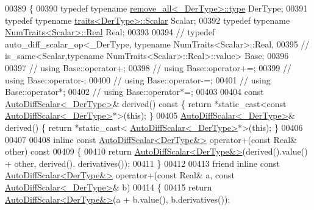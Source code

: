 \begin{DoxyCode}
00389 \{
00390   \textcolor{keyword}{typedef} \textcolor{keyword}{typename} \hyperlink{struct_eigen_1_1internal_1_1remove__all}{remove\_all<\_DerType>::type} DerType;
00391   \textcolor{keyword}{typedef} \textcolor{keyword}{typename} \hyperlink{struct_eigen_1_1internal_1_1traits}{traits<DerType>::Scalar} Scalar;
00392   \textcolor{keyword}{typedef} \textcolor{keyword}{typename} \hyperlink{group___core___module_struct_eigen_1_1_num_traits}{NumTraits<Scalar>::Real} Real;
00393 
00394 \textcolor{comment}{//   typedef auto\_diff\_scalar\_op<\_DerType, typename NumTraits<Scalar>::Real,}
00395 \textcolor{comment}{//                            is\_same<Scalar,typename NumTraits<Scalar>::Real>::value> Base;}
00396 
00397 \textcolor{comment}{//   using Base::operator+;}
00398 \textcolor{comment}{//   using Base::operator+=;}
00399 \textcolor{comment}{//   using Base::operator-;}
00400 \textcolor{comment}{//   using Base::operator-=;}
00401 \textcolor{comment}{//   using Base::operator*;}
00402 \textcolor{comment}{//   using Base::operator*=;}
00403 
00404   \textcolor{keyword}{const} \hyperlink{class_eigen_1_1_auto_diff_scalar}{AutoDiffScalar<\_DerType>}& derived()\textcolor{keyword}{ const }\{ \textcolor{keywordflow}{return} *\textcolor{keyword}{static\_cast<}\textcolor{keyword}{const }
      \hyperlink{class_eigen_1_1_auto_diff_scalar}{AutoDiffScalar<\_DerType>}*\textcolor{keyword}{>}(\textcolor{keyword}{this}); \}
00405   \hyperlink{class_eigen_1_1_auto_diff_scalar}{AutoDiffScalar<\_DerType>}& derived() \{ \textcolor{keywordflow}{return} *\textcolor{keyword}{static\_cast<}
      \hyperlink{class_eigen_1_1_auto_diff_scalar}{AutoDiffScalar<\_DerType>}*\textcolor{keyword}{>}(\textcolor{keyword}{this}); \}
00406 
00407 
00408   \textcolor{keyword}{inline} \textcolor{keyword}{const} \hyperlink{class_eigen_1_1_auto_diff_scalar}{AutoDiffScalar<DerType&>} operator+(\textcolor{keyword}{const} Real& other)\textcolor{keyword}{ const}
00409 \textcolor{keyword}{  }\{
00410     \textcolor{keywordflow}{return} \hyperlink{class_eigen_1_1_auto_diff_scalar}{AutoDiffScalar<DerType&>}(derived().value() + other, derived().
      derivatives());
00411   \}
00412 
00413   \textcolor{keyword}{friend} \textcolor{keyword}{inline} \textcolor{keyword}{const} \hyperlink{class_eigen_1_1_auto_diff_scalar}{AutoDiffScalar<DerType&>} operator+(\textcolor{keyword}{const} Real& a, \textcolor{keyword}{const} 
      \hyperlink{class_eigen_1_1_auto_diff_scalar}{AutoDiffScalar<\_DerType>}& b)
00414   \{
00415     \textcolor{keywordflow}{return} \hyperlink{class_eigen_1_1_auto_diff_scalar}{AutoDiffScalar<DerType&>}(a + b.value(), b.derivatives());

\end{DoxyCode}
